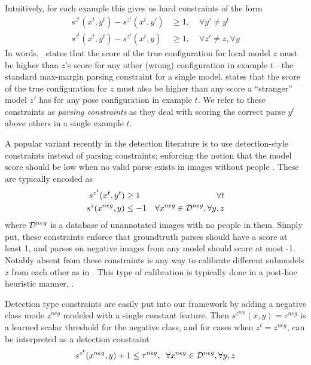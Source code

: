  Intuitively, for each example this gives us hard 
constraints of the form \begin{align}
s^{z^t}(x^t,y^t) - s^{z^t}(x^t,y') &\geq 1,\; &\forall y' \neq y^t 
\label{eq:c1} \\
s^{z^t}(x^t,y^t) - s^{z'}(x^t,y) &\geq 1 ,\; &\forall z' \neq z, \forall y 
\label{eq:c2}
\end{align}
In words,~ states that the score of the true configuration for local 
model $z$ must be higher than $z$'s score for any other (wrong) configuration 
in example $t$---the standard max-margin parsing constraint for a single model.  
 states that the score of the true configuration for $z$ must also 
be higher than any score a ``stranger'' model $z'$ has for any pose 
configuration in example $t$.  We refer to these constraints as {\em parsing
constraints} as they deal with scoring the correct parse $y^t$ above others in 
a single example $t$.

 A popular variant recently in the detection 
literature is to use detection-style constraints instead of parsing 
constraints; enforcing the notion that the model score should be low when no 
valid parse exists in images without people 
\citep{deva2011,batra2012,tianexploring}.  These are typically encoded as
\begin{align}
s^{z^t}(x^t, y^t) &\geq 1 &\forall t \\
s^{z}(x^{neg}, y) &\leq -1 &\forall x^{neg} \in \mathcal{D}^{neg}, \forall y,z
\end{align}
where $\mathcal{D}^{neg}$ is a database of unannotated images with no people in them.  
Simply put, these constraints enforce that groundtruth parses should have a 
score at least 1, and parses on negative images from any model should score at 
most -1.  Notably absent from these constraints is any way to calibrate 
different submodels $z$ from each other as in .  This type of 
calibration is typically done in a post-hoc heuristic manner, \eg 
\citep{everingham2011,esvm}.  

Detection type constraints are easily put into our framework by adding a 
negative class mode $z^{neg}$ modeled with a single constant feature.  Then 
$s^{z^{neg}}(x,y) = \tau^{neg}$ is a learned scalar threshold for the negative 
class, and for cases when $z^t = z^{neg}$,  can be interpreted as a 
detection constraint
\begin{align}
s^{z^t}(x^{neg},y) + 1 \leq \tau^{neg},\;\; \forall x^{neg} \in \mathcal{D}^{neg}, 
\forall y,z\label{eq:cneg}
\end{align}

